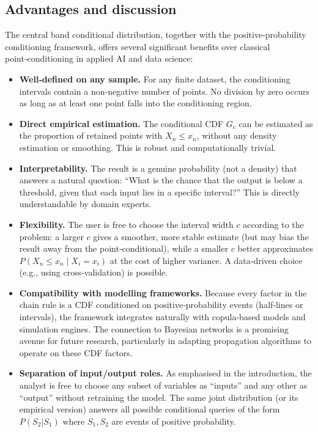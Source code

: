 \subsection*{Advantages and discussion}

The central band conditional distribution, together with the positive‑probability conditioning framework, offers several significant benefits over classical point‑conditioning in applied AI and data science:

\begin{itemize}
\item \textbf{Well‑defined on any sample.}
   For any finite dataset, the conditioning intervals contain a non‑negative number of points. No division by zero occurs as long as at least one point falls into the conditioning region.

\item \textbf{Direct empirical estimation.}
   The conditional CDF $G_c$ can be estimated as the proportion of retained points with $X_n \le x_n$, without any density estimation or smoothing. This is robust and computationally trivial.

\item \textbf{Interpretability.}
   The result is a genuine probability (not a density) that answers a natural question: “What is the chance that the output is below a threshold, given that each input lies in a specific interval?” This is directly understandable by domain experts.

\item \textbf{Flexibility.}
   The user is free to choose the interval width $c$ according to the problem: a larger $c$ gives a smoother, more stable estimate (but may bias the result away from the point‑conditional), while a smaller $c$ better approximates $P(X_n \le x_n \mid X_i = x_i)$ at the cost of higher variance. A data‑driven choice (e.g., using cross‑validation) is possible.

\item \textbf{Compatibility with modelling frameworks.}
   Because every factor in the chain rule is a CDF conditioned on positive‑probability events (half‑lines or intervals), the framework integrates naturally with copula-based models and simulation engines. The connection to Bayesian networks is a promising avenue for future research, particularly in adapting propagation algorithms to operate on these CDF factors.

\item \textbf{Separation of input/output roles.}
   As emphasised in the introduction, the analyst is free to choose any subset of variables as “inputs” and any other as “output” without retraining the model. The same joint distribution (or its empirical version) answers all possible conditional queries of the form $P(S_2 | S_1)$ where $S_1,S_2$ are events of positive probability.
\end{itemize}

